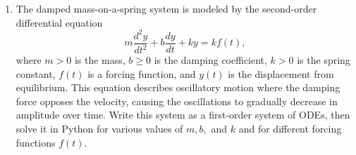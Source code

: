 \documentclass[10pt]{article}
\begin{document}
\begin{enumerate}[{$\qquad 1.]
\begin{enumerate}
\end{enumerate}





\pagebreak 



\item The damped mass-on-a-spring system is modeled by the second-order differential equation 
\[ m \frac{d^2y}{dt^2} + b \frac{dy}{dt} + ky = kf(t), \] 
where $m>0$ is the mass, $b\geq 0$ is the damping coefficient, $k>0$ is the spring constant, $f(t)$ is a forcing function, and $y(t)$  is the displacement from equilibrium. This equation describes oscillatory motion where the damping force opposes the velocity, causing the oscillations to gradually decrease in amplitude over time.  Write this system as a first-order system of ODEs, then solve it in Python for various values of $m, b,$ and $k$ and for different forcing functions $f(t)$.  


\end{enumerate}
\end{document}
